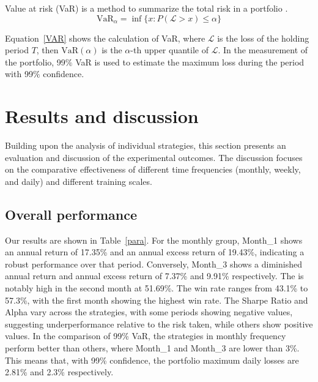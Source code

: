\documentclass[preprint,12pt]{elsarticle}
\begin{document}
Value at risk (VaR) is a method to summarize the total risk in a portfolio \citep{hull2012risk}. 
\begin{equation}
\mathrm{VaR}_{\alpha} = \inf \{x:P(\mathcal{L}>x) \leq \alpha \}
\label{VAR}
\end{equation}

Equation~\eqref{VAR} shows the calculation of VaR, where $\mathcal{L}$ is the loss of the holding period $T$, then $\mathrm{VaR}(\alpha)$ is the $\alpha$-th upper quantile of $\mathcal{L}$. In the measurement of the portfolio, 99$\%$ VaR is used to estimate the maximum loss during the period with 99$\%$ confidence.


\section{Results and discussion} \label{result}
Building upon the analysis of individual strategies, this section presents an evaluation and discussion of the experimental outcomes. The discussion focuses on the comparative effectiveness of different time frequencies (monthly, weekly, and daily) and different training scales.  

\subsection{Overall performance}
Our results are shown in Table~\ref{para}. For the monthly group, Month\_1 shows an annual return of 17.35\% and an annual excess return of 19.43\%, indicating a robust performance over that period. Conversely, Month\_3 shows a diminished annual return and annual excess return of 7.37\% and 9.91\% respectively. The  is notably high in the second month at 51.69\%. The win rate ranges from 43.1\% to 57.3\%, with the first month showing the highest win rate. The Sharpe Ratio and Alpha vary across the strategies, with some periods showing negative values, suggesting underperformance relative to the risk taken, while others show positive values. In the comparison of 99\% VaR, the strategies in monthly frequency perform better than others, where Month\_1 and Month\_3 are lower than 3\%. This means that, with 99\% confidence, the portfolio maximum daily losses are 2.81\% and 2.3\% respectively.
\end{document}
